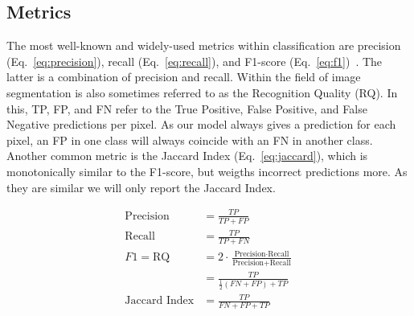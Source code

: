 \subsection{Metrics}
The most well-known and widely-used metrics within classification are precision (Eq.~\ref{eq:precision}), recall (Eq.~\ref{eq:recall}), and F1-score (Eq.~\ref{eq:f1})~\cite{rijsbergen1979information}. The latter is a combination of precision and recall. Within the field of image segmentation is also sometimes referred to as the Recognition Quality (RQ). In this, TP, FP, and FN refer to the True Positive, False Positive, and False Negative predictions per pixel. As our model always gives a prediction for each pixel, an FP in one class will always coincide with an FN in another class. Another common metric is the Jaccard Index (Eq.~\ref{eq:jaccard}), which is monotonically similar to the F1-score, but weigths incorrect predictions more. As they are similar we will only report the Jaccard Index.

\begin{subequations}
    \begin{align}
        \text{Precision}     & = \frac{TP}{TP + FP} \label{eq:precision}                                               \\
        \text{Recall}        & = \frac{TP}{TP + FN} \label{eq:recall}                                                  \\
        F1 = \text{RQ}       & = 2 \cdot \frac{\text{Precision} \cdot \text{Recall}}{\text{Precision} + \text{Recall}} \\ 
                             & = \frac{TP}{\frac{1}{2} (FN + FP) + TP} \label{eq:f1}                                   \\
        \text{Jaccard Index} & = \frac{TP}{FN + FP + TP} \label{eq:jaccard}
    \end{align}
\end{subequations}
